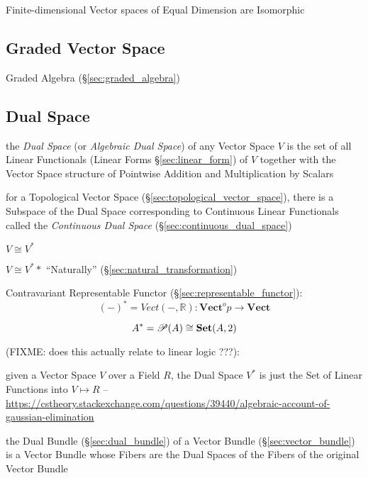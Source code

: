 Finite-dimensional Vector spaces of Equal Dimension are Isomorphic



\subsection{Graded Vector Space}\label{sec:graded_vectorspace}

Graded Algebra (\S\ref{sec:graded_algebra})



\subsection{Dual Space}\label{sec:dual_space}

the \emph{Dual Space} (or \emph{Algebraic Dual Space}) of any Vector Space $V$
is the set of all Linear Functionals (Linear Forms \S\ref{sec:linear_form}) of
$V$ together with the Vector Space structure of Pointwise Addition and
Multiplication by Scalars

for a Topological Vector Space (\S\ref{sec:topological_vector_space}), there is
a Subspace of the Dual Space corresponding to Continuous Linear Functionals
called the \emph{Continuous Dual Space} (\S\ref{sec:continuous_dual_space})

$V \cong V^*$

$V \cong V^**$ ``Naturally'' (\S\ref{sec:natural_transformation})

Contravariant Representable Functor
(\S\ref{sec:representable_functor}):
\[
  (-)^* = Vect(-,\mathbb{R}) :
    \mathbf{Vect}^op \rightarrow \mathbf{Vect}
\]

\[
  A^* = \mathscr{P}(A) \cong \mathbf{Set}(A,2)
\]\cite{awodey06}

(FIXME: does this actually relate to linear logic ???):

given a Vector Space $V$ over a Field $R$, the Dual Space $V^*$ is just the Set
of Linear Functions into $V \mapsto R$
--\url{https://cstheory.stackexchange.com/questions/39440/algebraic-account-of-gaussian-elimination}

the Dual Bundle (\S\ref{sec:dual_bundle}) of a Vector Bundle
(\S\ref{sec:vector_bundle}) is a Vector Bundle whose Fibers are the Dual Spaces
of the Fibers of the original Vector Bundle



